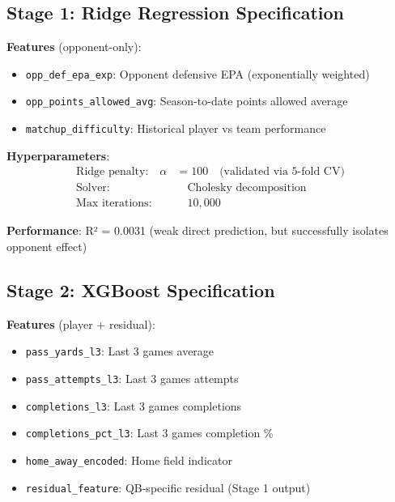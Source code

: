 \subsection{Stage 1: Ridge Regression Specification}

\textbf{Features} (opponent-only):
\begin{itemize}
\item \texttt{opp\_def\_epa\_exp}: Opponent defensive EPA (exponentially weighted)
\item \texttt{opp\_points\_allowed\_avg}: Season-to-date points allowed average
\item \texttt{matchup\_difficulty}: Historical player vs team performance
\end{itemize}

\textbf{Hyperparameters}:
\begin{align}
\text{Ridge penalty:} \quad \alpha &= 100 \quad \text{(validated via 5-fold CV)} \\
\text{Solver:} & \quad \text{Cholesky decomposition} \\
\text{Max iterations:} & \quad 10{,}000
\end{align}

\textbf{Performance}: R² = 0.0031 (weak direct prediction, but successfully isolates opponent effect)

\subsection{Stage 2: XGBoost Specification}

\textbf{Features} (player + residual):
\begin{itemize}
\item \texttt{pass\_yards\_l3}: Last 3 games average
\item \texttt{pass\_attempts\_l3}: Last 3 games attempts
\item \texttt{completions\_l3}: Last 3 games completions
\item \texttt{completions\_pct\_l3}: Last 3 games completion \%
\item \texttt{home\_away\_encoded}: Home field indicator
\item \texttt{residual\_feature}: QB-specific residual (Stage 1 output)
\end{itemize}

